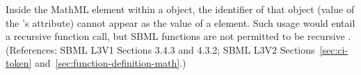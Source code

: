 Inside the  MathML element within a \FunctionDefinition
object, the identifier of that object (\ie value of the
\FunctionDefinition's  attribute) cannot appear as the value of a
 element.  Such usage would entail a recursive function call, but
SBML functions are not permitted to be recursive .  (References: SBML L3V1 Sections 3.4.3 and 4.3.2; SBML L3V2
Sections~\ref{sec:ci-token} and~\ref{sec:function-definition-math}.)
